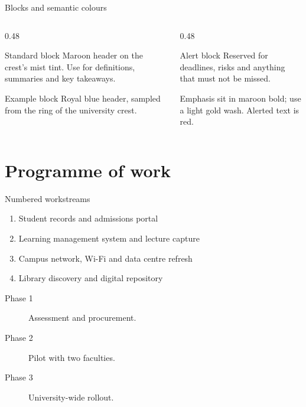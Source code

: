 \documentclass[aspectratio=169,11pt]{beamer}
\begin{document}
\begin{frame}{Blocks and semantic colours}
  \begin{columns}[T,onlytextwidth]
    \begin{column}{0.48\textwidth}
      \begin{block}{Standard block}
        Maroon header on the crest's mist tint. Use for definitions,
        summaries and key takeaways.
      \end{block}
      \begin{exampleblock}{Example block}
        Royal blue header, sampled from the ring of the university crest.
      \end{exampleblock}
    \end{column}
    \begin{column}{0.48\textwidth}
      \begin{alertblock}{Alert block}
        Reserved for deadlines, risks and anything that must not be missed.
      \end{alertblock}
      \begin{block}{Emphasis}
         sit in maroon bold;  use a
        light gold wash. \alert{Alerted text} is red.
      \end{block}
    \end{column}
  \end{columns}
\end{frame}

\section{Programme of work}

\begin{frame}
\end{frame}

\begin{frame}{Numbered workstreams}
  \begin{enumerate}
    \item Student records and admissions portal
    \item Learning management system and lecture capture
    \item Campus network, Wi-Fi and data centre refresh
    \item Library discovery and digital repository
  \end{enumerate}

  \begin{description}
    \item[Phase 1] Assessment and procurement.
    \item[Phase 2] Pilot with two faculties.
    \item[Phase 3] University-wide rollout.
  \end{description}
\end{frame}
\end{document}
